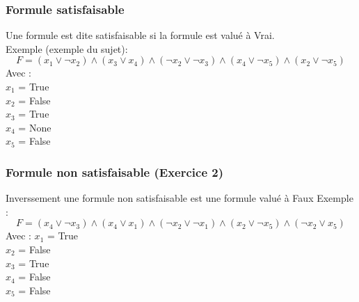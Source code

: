 \documentclass{article}
\begin{document}
    \subsubsection{Formule satisfaisable}
    Une formule est dite satisfaisable si la formule est valué à Vrai. \\
    Exemple (exemple du sujet): \\
    \begin{equation*}
        F=(x_1 \lor \neg x_2) \wedge (x_3 \lor x_4) \wedge (\neg x_2 \lor \neg x_3) \wedge (x_4 \lor \neg x_5) \wedge (x_2 \lor \neg x_5)
    \end{equation*}
    Avec : \\
    $x_1$ = True \\
    $x_2$ = False \\
    $x_3$ = True \\
    $x_4$ = None \\ 
    $x_5$ = False \\
    \newpage
    \subsubsection{Formule non satisfaisable (Exercice 2)}
    Inverssement une formule non satisfaisable est une formule valué à Faux
    Exemple : \\
    \begin{equation*}
        F=(x_4 \lor \neg x_3) \wedge (x_4 \lor x_1) \wedge (\neg x_2 \lor \neg x_1) \wedge (x_2 \lor \neg x_5) \wedge (\neg x_2 \lor x_5)
    \end{equation*}
    Avec :
    $x_1$ = True \\
    $x_2$ = False \\
    $x_3$ = True \\
    $x_4$ = False \\ 
    $x_5$ = False \\
\end{document}
